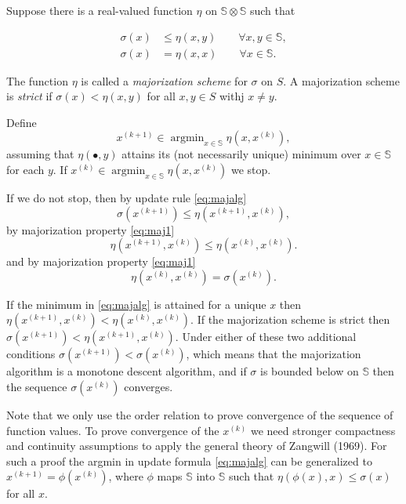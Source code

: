 \documentclass[
  12pt,
]{article}
\begin{document}
Suppose there is a real-valued function \(\eta\) on
\(\mathbb{S}\otimes\mathbb{S}\) such that

\begin{align}
\sigma(x)&\leq\eta(x,y)\qquad\forall x,y\in\mathbb{S},\label{eq:maj1}\\
\sigma(x)&=\eta(x,x)\qquad\forall x\in\mathbb{S}.\label{eq:maj2}
\end{align}

The function \(\eta\) is called a \emph{majorization scheme} for \(\sigma\) on
\(S\). A majorization scheme is \emph{strict} if \(\sigma(x)<\eta(x,y)\) for all
\(x,y\in S\) withj \(x\not=y\).

Define \begin{equation}
x^{(k+1)}\in\mathop{\text{argmin}}_{x\in\mathbb{S}}\eta(x,x^{(k)}),
\label{eq:majalg}
\end{equation} assuming that \(\eta(\bullet,y)\) attains its (not
necessarily unique) minimum over \(x\in\mathbb{S}\) for each \(y\). If
\(x^{(k)}\in\mathop{\text{argmin}}_{x\in\mathbb{S}}\eta(x,x^{(k)})\) we
stop.

If we do not stop, then by update rule \eqref{eq:majalg} \begin{equation}
\sigma(x^{(k+1)})\leq\eta(x^{(k+1)},x^{(k)}),
\end{equation} by majorization property \eqref{eq:maj1} \begin{equation}
\eta(x^{(k+1)},x^{(k)})\leq\eta(x^{(k)},x^{(k)}).
\end{equation} and by majorization property \eqref{eq:maj1}
\begin{equation}
\eta(x^{(k)},x^{(k)})=\sigma(x^{(k)}).
\end{equation}

If the minimum in \eqref{eq:majalg} is attained for a unique \(x\) then
\(\eta(x^{(k+1)},x^{(k)})<\eta(x^{(k)},x^{(k)})\). If the majorization
scheme is strict then \(\sigma(x^{(k+1)})<\eta(x^{(k+1)},x^{(k)})\). Under
either of these two additional conditions
\(\sigma(x^{(k+1)})<\sigma(x^{(k)})\), which means that the majorization
algorithm is a monotone descent algorithm, and if \(\sigma\) is bounded
below on \(\mathbb{S}\) then the sequence \(\sigma(x^{(k)})\) converges.

Note that we only use the order relation to prove convergence of the
sequence of function values. To prove convergence of the \(x^{(k)}\) we
need stronger compactness and continuity assumptions to apply the
general theory of Zangwill (1969). For such a proof the argmin in update
formula \eqref{eq:majalg} can be generalized to
\(x^{(k+1)}=\phi(x^{(k)})\), where \(\phi\) maps \(\mathbb{S}\) into
\(\mathbb{S}\) such that \(\eta(\phi(x),x)\leq\sigma(x)\) for all \(x\).
\end{document}
